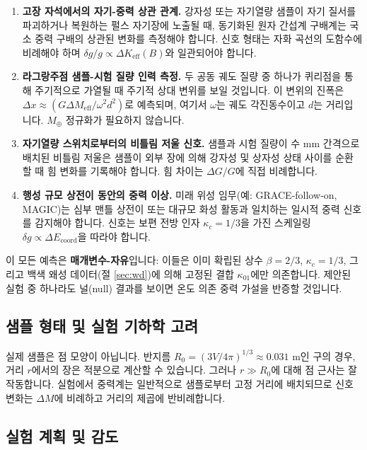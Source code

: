 \documentclass[11pt,a4paper]{article}
\begin{document}
	\begin{enumerate}
		\item \textbf{고장 자석에서의 자기-중력 상관 관계.} 강자성 또는 자기열량 샘플이 자기 질서를 파괴하거나 복원하는 펄스 자기장에 노출될 때, 동기화된 원자 간섭계 구배계는 국소 중력 구배의 상관된 변화를 측정해야 합니다. 신호 형태는 자화 곡선의 도함수에 비례해야 하며 $\delta g/g \propto \Delta K_{\mathrm{eff}}(B)$와 일관되어야 합니다.
		\item \textbf{라그랑주점 샘플-시험 질량 인력 측정.} 두 공동 궤도 질량 중 하나가 퀴리점을 통해 주기적으로 가열될 때 주기적 상대 변위를 보일 것입니다. 이 변위의 진폭은 $\Delta x \approx (G \Delta M_{\mathrm{eff}} / \omega^2 d^2)$로 예측되며, 여기서 $\omega$는 궤도 각진동수이고 $d$는 거리입니다. $M_\oplus$ 정규화가 필요하지 않습니다.
		\item \textbf{자기열량 스위치로부터의 비틀림 저울 신호.} 샘플과 시험 질량이 수 mm 간격으로 배치된 비틀림 저울은 샘플이 외부 장에 의해 강자성 및 상자성 상태 사이를 순환할 때 힘 변화를 기록해야 합니다. 힘 차이는 $\Delta G/G$에 직접 비례합니다.
		\item \textbf{행성 규모 상전이 동안의 중력 이상.} 미래 위성 임무(예: GRACE‑follow‑on, MAGIC)는 심부 맨틀 상전이 또는 대규모 화성 활동과 일치하는 일시적 중력 신호를 감지해야 합니다. 신호는 보편 전방 인자 $\kappa_c = 1/3$을 가진 스케일링 $\delta g \propto \Delta E_{\mathrm{coord}}$을 따라야 합니다.
	\end{enumerate}
	
	이 모든 예측은 \textbf{매개변수-자유}입니다: 이들은 이미 확립된 상수 $\beta = 2/3$, $\kappa_c = 1/3$, 그리고 백색 왜성 데이터(절 \ref{sec:wd})에 의해 고정된 결합 $\kappa_{01}$에만 의존합니다. 제안된 실험 중 하나라도 널(null) 결과를 보이면 온도 의존 중력 가설을 반증할 것입니다.
	
	\subsection{샘플 형태 및 실험 기하학 고려}
	\label{subsec:lab-geometry}
	
	실제 샘플은 점 모양이 아닙니다. 반지름 $R_0 = (3V/4\pi)^{1/3} \approx 0.031$ m인 구의 경우, 거리 $r$에서의 장은 적분으로 계산할 수 있습니다. 그러나 $r \gg R_0$에 대해 점 근사는 잘 작동합니다. 실험에서 중력계는 일반적으로 샘플로부터 고정 거리에 배치되므로 신호 변화는 $\Delta M$에 비례하고 거리의 제곱에 반비례합니다.
	
	\subsection{실험 계획 및 감도}
	\label{subsec:lab-scheme}
	
\end{document}
